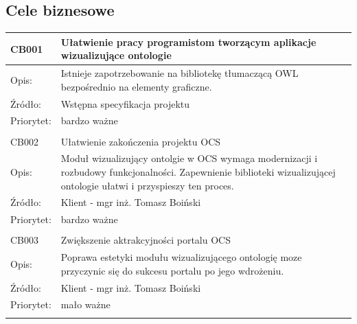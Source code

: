\documentclass[a4paper,10pt]{article}
\begin{document}

\subsection{Cele biznesowe}




\begin{center}
\begin{tabular}{|m{3cm}|m{9cm}|} \hline

CB001 & Ułatwienie pracy programistom tworzącym aplikacje wizualizujące ontologie  \\ \hline
Opis: & Istnieje zapotrzebowanie na bibliotekę tłumaczącą OWL bezpośrednio na elementy graficzne.  \\ \hline
Źródło: & Wstępna specyfikacja projektu \\ \hline
Priorytet: & bardzo ważne \\ \hline
\multicolumn{2}{c}{} \\


 \hline
CB002 & Ułatwienie zakończenia projektu OCS   \\ \hline
Opis: & Moduł wizualizujący ontolgie w OCS wymaga modernizacji i rozbudowy funkcjonalności. Zapewnienie biblioteki wizualizującej ontologie ułatwi i przyspieszy ten proces.  \\ \hline
Źródło:& Klient - mgr inż. Tomasz Boiński   \\ \hline
Priorytet: & bardzo ważne \\ \hline
\multicolumn{2}{c}{} \\
 \hline
CB003 & Zwiększenie aktrakcyjności portalu OCS   \\ \hline
Opis: & Poprawa estetyki modułu wizualizującego ontologię moze przyczynic się do sukcesu portalu po jego wdrożeniu.  \\ \hline
Źródło: & Klient - mgr inż. Tomasz Boiński \\ \hline
Priorytet: & mało ważne \\ \hline
\multicolumn{2}{c}{} \\
\end{tabular}


\end{center}
\end{document}
